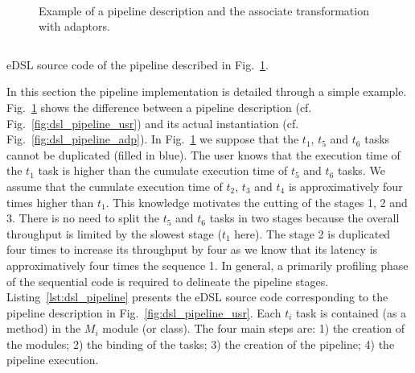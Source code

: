 \begin{figure}[htp]
  \centering
  \\
  \caption{Example of a pipeline description and the associate transformation
    with adaptors.}
  \label{fig:dsl_pipeline}
\end{figure}

\begin{listing}[htp]
  \inputminted[frame=lines,linenos]{C++}{main/chapter6/src/pipeline/pipeline.cpp}
  \caption{\AFFECT \Cxx eDSL source code of the pipeline described in
    Fig.~\ref{fig:dsl_pipeline}.}
  \label{lst:dsl_pipeline}
\end{listing}

In this section the pipeline implementation is detailed through a simple
example.
Fig.~\ref{fig:dsl_pipeline} shows the difference between a pipeline description
(cf. Fig.~\ref{fig:dsl_pipeline_usr}) and its actual instantiation (cf.
Fig.~\ref{fig:dsl_pipeline_adp}). In Fig.~\ref{fig:dsl_pipeline} we suppose
that the $t_1$, $t_5$ and $t_6$ tasks cannot be duplicated (filled in blue). The
user knows that the execution time of the $t_1$ task is higher than the cumulate
execution time of $t_5$ and $t_6$ tasks. We assume that the cumulate execution
time of $t_2$, $t_3$ and $t_4$ is approximatively four times higher than $t_1$.
This knowledge motivates the cutting of the stages 1, 2 and 3. There is no need
to split the $t_5$ and $t_6$ tasks in two stages because the overall throughput
is limited by the slowest stage ($t_1$ here). The stage 2 is duplicated four
times to increase its throughput by four as we know that its latency is
approximatively four times the sequence 1. In general, a primarily profiling
phase of the sequential code is required to delineate the pipeline stages.
Listing~\ref{lst:dsl_pipeline} presents the \Cxx eDSL source code corresponding
to the pipeline description in Fig.~\ref{fig:dsl_pipeline_usr}. Each $t_i$ task
is contained (as a method) in the $M_i$ module (or class). The four main steps
are: 1) the creation of the modules; 2) the binding of the tasks; 3) the
creation of the pipeline; 4) the pipeline execution.

